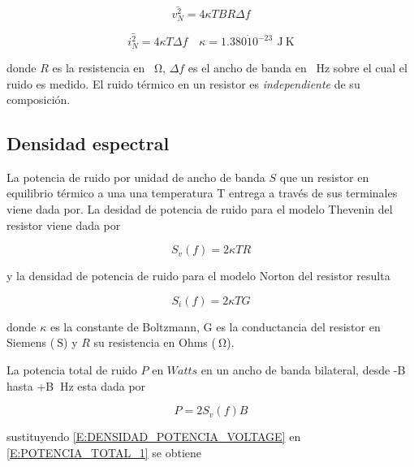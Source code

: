 \documentclass{article}
\begin{document}
		\begin{equation}
		\label{E:VOLTAGE_RUIDO}	
		\bar{v^2_{N}} = 4{\kappa}TBR{\Delta}f		
		\end{equation}
		
		\begin{equation}
		\label{E:CORRIENTE_RUIDO}
		\bar{i^2_{N}} = 4{\kappa}T{\Delta}f
		\text{$\quad{\kappa}=1.380\dot10^{-23} \, {\SI{}\joule}{\SI{}\kelvin}$} 	
		\end{equation}
		
		\noindent donde $R$ es la resistencia en \SI{}{\ohm}, ${\Delta}f$ es el ancho de banda en \SI{}{\hertz} sobre el cual el ruido es medido. El ruido térmico en un resistor es \emph{independiente} de su composición.
		
		\subsection{Densidad espectral}
		
		La potencia de ruido por unidad de ancho de banda $S$ que un resistor en equilibrio térmico a una una temperatura T entrega a través de sus terminales viene dada por. La desidad de potencia de ruido para el modelo Thevenin del resistor viene dada por
		
		\begin{equation}
		\label{E:DENSIDAD_POTENCIA_VOLTAGE}
		S_{v}(f) = 2{\kappa}TR
		\end{equation}
		
		\noindent y la densidad de potencia de ruido para el modelo Norton del resistor resulta	
		
		\begin{equation}
		\label{E:DENSIDAD_POTENCIA_CORRIENTE}
		S_{i}(f) = 2{\kappa}TG
		\end{equation}	
		
		\noindent donde $\kappa$ es la constante de Boltzmann, G es la conductancia del resistor en Siemens ($\SI{}\siemens$) y $R$ su resistencia en Ohms ($\SI{}\ohm$).	
		
		La potencia total de ruido $P$ en $Watts$ en un ancho de banda bilateral, desde -B hasta +B $\SI{}\hertz$ esta dada por
		
		\begin{equation}
		\label{E:POTENCIA_TOTAL_1}
		P = 2S_{v}(f)B
		\end{equation}
		
		\noindent sustituyendo \eqref{E:DENSIDAD_POTENCIA_VOLTAGE} en \eqref{E:POTENCIA_TOTAL_1} se obtiene
		
\end{document}
